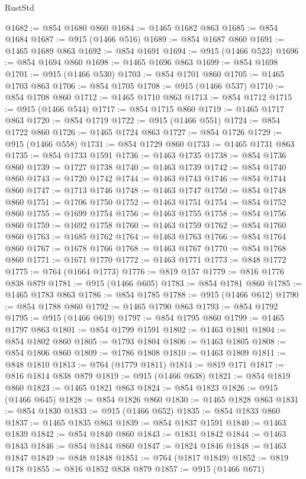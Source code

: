 \begin{lexlean}{RustStd}
\begin{coremodule}
@1682 := @854 @1680 @860
@1684 := @1465 @1682 @863
@1685 := @854 @1684
@1687 := @915 (@1466 @516)
@1689 := @854 @1687 @860
@1691 := @1465 @1689 @863
@1692 := @854 @1691
@1694 := @915 (@1466 @523)
@1696 := @854 @1694 @860
@1698 := @1465 @1696 @863
@1699 := @854 @1698
@1701 := @915 (@1466 @530)
@1703 := @854 @1701 @860
@1705 := @1465 @1703 @863
@1706 := @854 @1705
@1708 := @915 (@1466 @537)
@1710 := @854 @1708 @860
@1712 := @1465 @1710 @863
@1713 := @854 @1712
@1715 := @915 (@1466 @544)
@1717 := @854 @1715 @860
@1719 := @1465 @1717 @863
@1720 := @854 @1719
@1722 := @915 (@1466 @551)
@1724 := @854 @1722 @860
@1726 := @1465 @1724 @863
@1727 := @854 @1726
@1729 := @915 (@1466 @558)
@1731 := @854 @1729 @860
@1733 := @1465 @1731 @863
@1735 := @854 @1733 @1591
@1736 := @1463 @1735
@1738 := @854 @1736 @860
@1739 := @1727 @1738
@1740 := @1463 @1739
@1742 := @854 @1740 @860
@1743 := @1720 @1742
@1744 := @1463 @1743
@1746 := @854 @1744 @860
@1747 := @1713 @1746
@1748 := @1463 @1747
@1750 := @854 @1748 @860
@1751 := @1706 @1750
@1752 := @1463 @1751
@1754 := @854 @1752 @860
@1755 := @1699 @1754
@1756 := @1463 @1755
@1758 := @854 @1756 @860
@1759 := @1692 @1758
@1760 := @1463 @1759
@1762 := @854 @1760 @860
@1763 := @1685 @1762
@1764 := @1463 @1763
@1766 := @854 @1764 @860
@1767 := @1678 @1766
@1768 := @1463 @1767
@1770 := @854 @1768 @860
@1771 := @1671 @1770
@1772 := @1463 @1771
@1773 := @848 @1772
@1775 := @764 (@1664 @1773)
@1776 := @819 @157
@1779 := @816 @1776 @838 @879
@1781 := @915 (@1466 @605)
@1783 := @854 @1781 @860
@1785 := @1465 @1783 @863
@1786 := @854 @1785
@1788 := @915 (@1466 @612)
@1790 := @854 @1788 @860
@1792 := @1465 @1790 @863
@1793 := @854 @1792
@1795 := @915 (@1466 @619)
@1797 := @854 @1795 @860
@1799 := @1465 @1797 @863
@1801 := @854 @1799 @1591
@1802 := @1463 @1801
@1804 := @854 @1802 @860
@1805 := @1793 @1804
@1806 := @1463 @1805
@1808 := @854 @1806 @860
@1809 := @1786 @1808
@1810 := @1463 @1809
@1811 := @848 @1810
@1813 := @764 (@1779 @1811)
@1814 := @819 @171
@1817 := @816 @1814 @838 @879
@1819 := @915 (@1466 @638)
@1821 := @854 @1819 @860
@1823 := @1465 @1821 @863
@1824 := @854 @1823
@1826 := @915 (@1466 @645)
@1828 := @854 @1826 @860
@1830 := @1465 @1828 @863
@1831 := @854 @1830
@1833 := @915 (@1466 @652)
@1835 := @854 @1833 @860
@1837 := @1465 @1835 @863
@1839 := @854 @1837 @1591
@1840 := @1463 @1839
@1842 := @854 @1840 @860
@1843 := @1831 @1842
@1844 := @1463 @1843
@1846 := @854 @1844 @860
@1847 := @1824 @1846
@1848 := @1463 @1847
@1849 := @848 @1848
@1851 := @764 (@1817 @1849)
@1852 := @819 @178
@1855 := @816 @1852 @838 @879
@1857 := @915 (@1466 @671)

\end{coremodule}
\end{lexlean}
